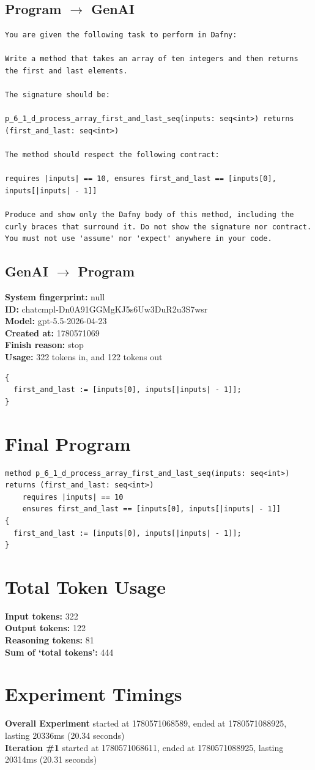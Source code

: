 \documentclass{article}
\begin{document}
\subsection*{Program $\rightarrow$ GenAI}
\begin{lstlisting}
You are given the following task to perform in Dafny:

Write a method that takes an array of ten integers and then returns the first and last elements.

The signature should be:

p_6_1_d_process_array_first_and_last_seq(inputs: seq<int>) returns (first_and_last: seq<int>)

The method should respect the following contract:

requires |inputs| == 10, ensures first_and_last == [inputs[0], inputs[|inputs| - 1]]

Produce and show only the Dafny body of this method, including the curly braces that surround it. Do not show the signature nor contract. You must not use 'assume' nor 'expect' anywhere in your code.
\end{lstlisting}
\subsection*{GenAI $\rightarrow$ Program}
\textbf{System fingerprint: }null
\\\textbf{ID: }chatcmpl-Dn0A91GGMgKJ5s6Uw3DuR2u3S7wsr
\\\textbf{Model: }gpt-5.5-2026-04-23
\\\textbf{Created at: }1780571069
\\\textbf{Finish reason: }stop
\\\textbf{Usage: }322 tokens in, and 122 tokens out
\begin{lstlisting}
{
  first_and_last := [inputs[0], inputs[|inputs| - 1]];
}
\end{lstlisting}
\section*{Final Program}
\begin{lstlisting}
method p_6_1_d_process_array_first_and_last_seq(inputs: seq<int>) returns (first_and_last: seq<int>)
	requires |inputs| == 10
	ensures first_and_last == [inputs[0], inputs[|inputs| - 1]]
{
  first_and_last := [inputs[0], inputs[|inputs| - 1]];
}
\end{lstlisting}
\section*{Total Token Usage}
\textbf{Input tokens: }322
\\\textbf{Output tokens: }122
\\\textbf{Reasoning tokens: }81
\\\textbf{Sum of `total tokens': }444
\section*{Experiment Timings}
\textbf{Overall Experiment} started at 1780571068589, ended at 1780571088925, lasting 20336ms (20.34 seconds)
\\\textbf{Iteration \#1} started at 1780571068611, ended at 1780571088925, lasting 20314ms (20.31 seconds)
\end{document}

